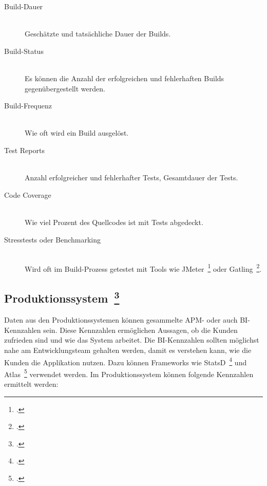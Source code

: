 \begin{description}
  \item[Build-Dauer] \hfill \\ Geschätzte und tatsächliche Dauer der Builds.
  \item[Build-Status] \hfill \\ Es können die Anzahl der erfolgreichen und fehlerhaften Builds gegenübergestellt werden.
  \item[Build-Frequenz] \hfill \\ Wie oft wird ein Build ausgelöst.
  \item[Test Reports] \hfill \\ Anzahl erfolgreicher und fehlerhafter Tests, Gesamtdauer der Tests.
  \item[Code Coverage] \hfill \\ Wie viel Prozent des Quellcodes ist mit Tests abgedeckt.
  \item[Stresstests oder Benchmarking] \hfill \\ Wird oft im Build-Prozess getestet mit Tools wie JMeter~\footcite[][]{jmeter} oder Gatling~\footcite[][]{gatling}.
\end{description}

\clearpage
\subsection[Produktionssystem]{Produktionssystem~\footcite[vgl.][S.107ff]{davis_agile_2015}}

Daten aus den Produktionssystemen können gesammelte \acf{APM}- oder auch \acf{BI}-Kennzahlen sein.
Diese Kennzahlen ermöglichen Aussagen, ob die Kunden zufrieden sind und wie das System arbeitet.
Die \ac{BI}-Kennzahlen sollten möglichst nahe am Entwicklungsteam gehalten werden, damit es verstehen kann, wie die Kunden die Applikation nutzen.
Dazu können Frameworks wie StatsD~\footcite[][]{statsd} und Atlas~\footcite[][]{atlas} verwendet werden.
Im Produktionssystem können folgende Kennzahlen ermittelt werden:

